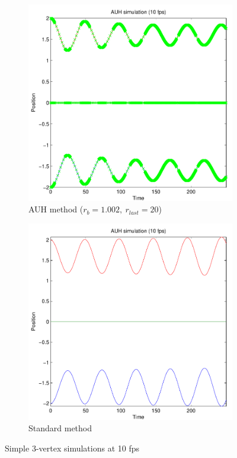 \documentclass[11pt]{article}
\begin{document}
\begin{figure}
    \begin{subfigure}[t]{0.5\textwidth}
        \includegraphics[width=\textwidth]{../images/atomic_uniform_10fps_0.pdf}
        \caption{AUH method ($r_b = 1.002,~r_{last} = 20$)}
        \label{fig:atomic_uniform_10fps_0}
    \end{subfigure}
    \begin{subfigure}[t]{0.5\textwidth}
        \includegraphics[width=\textwidth]{../images/atomic_uniform_10fps_1.pdf}
        \caption{Standard method}
        \label{fig:atomic_uniform_10fps_1}
    \end{subfigure}
    \caption{Simple 3-vertex simulations at 10 fps}
    \label{fig:atomic_uniform}
\end{figure}
\end{document}
